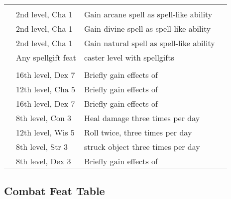 {\begin{longtabu}{>{\lcol}p{10em} >{\lcol}p{15em} >{\lcol}X >{\lcol}p{3em}}
    \midrule
     &  &  &  \\
     & 2nd level, Cha 1 & Gain arcane spell as spell-like ability &  \\
     & 2nd level, Cha 1 & Gain divine spell as spell-like ability &  \\
     & 2nd level, Cha 1 & Gain natural spell as spell-like ability &  \\
     & Any spellgift feat &  caster level with spellgifts &  \\

    \midrule
     &  &  &  \\
     & 16th level, Dex 7 & Briefly gain effects of  &  \\
     & 12th level, Cha 5 & Briefly gain effects of  &  \\
     & 16th level, Dex 7 & Briefly gain effects of  &  \\
     & 8th level, Con 3 & Heal damage three times per day &  \\
     & 12th level, Wis 5 & Roll twice, three times per day &  \\
     & 8th level, Str 3 &  struck object three times per day &  \\
     & 8th level, Dex 3 & Briefly gain effects of  &  \\
\end{longtabu}}

\subsection{Combat Feat Table}\label{cap:Combat Feats}

